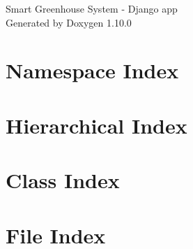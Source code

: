 \documentclass[twoside]{book}
\newcommand{\+}{\discretionary{\mbox{\scriptsize$\hookleftarrow$}}{}{}}
\newcommand{\clearemptydoublepage}{%
    \newpage{\pagestyle{empty}\cleardoublepage}%
  }
\begin{document}
  \raggedbottom
    \hypersetup{pageanchor=false,
                bookmarksnumbered=true,
                pdfencoding=unicode
               }
  \begin{titlepage}
  \vspace*{7cm}
  \begin{center}%
  {\Large Smart Greenhouse System -\/ Django app}\\
  \vspace*{1cm}
  {\large Generated by Doxygen 1.10.0}\\
  \end{center}
  \end{titlepage}
  \clearemptydoublepage
  \tableofcontents
  \clearemptydoublepage
  \hypersetup{pageanchor=true}


\chapter{Namespace Index}

\chapter{Hierarchical Index}

\chapter{Class Index}

\chapter{File Index}

\end{document}
